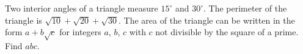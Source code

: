 Two interior angles of a triangle measure $15^\circ$ and $30^\circ$. The perimeter of the triangle is $\sqrt{10}+\sqrt{20}+\sqrt{30}$. The area of the triangle can be written in the form $a+b\sqrt c$ for integers $a$, $b$, $c$ with $c$ not divisible by the square of a prime. Find $abc$.
